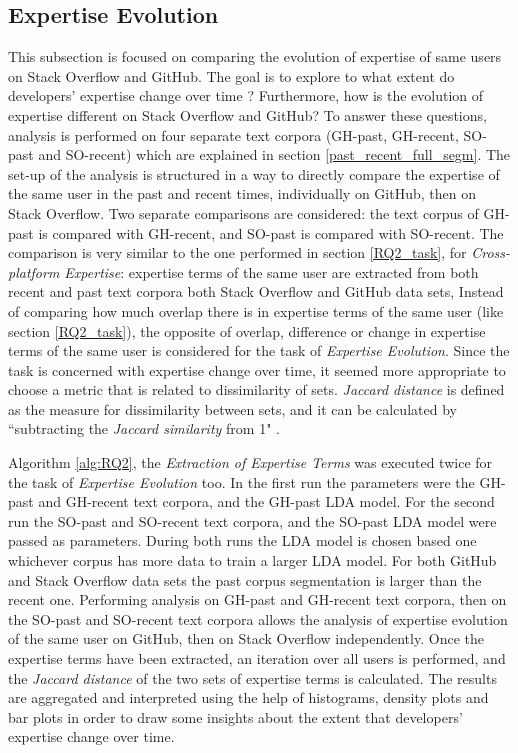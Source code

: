     \subsection{Expertise Evolution\label{RQ4_task}}
        
        This subsection is focused on comparing the evolution of expertise of same users on Stack Overflow and GitHub. The goal is to explore to what extent do developers' expertise change over time ? Furthermore, how is the evolution of expertise different on Stack Overflow and GitHub? To answer these questions, analysis is performed on four separate text corpora (GH-past, GH-recent, SO-past and SO-recent) which are explained in section \ref{past_recent_full_segm}. The set-up of the analysis is structured in a way to directly compare the expertise of the same user in the past and recent times, individually on GitHub, then on Stack Overflow. Two separate comparisons are considered: the text corpus of GH-past is compared with GH-recent, and SO-past is compared with SO-recent. The comparison is very similar to the one performed in section \ref{RQ2_task}, for \emph{Cross-platform Expertise}: expertise terms of the same user are extracted from both recent and past text corpora both Stack Overflow and GitHub data sets, Instead of comparing how much overlap there is in expertise terms of the same user (like section \ref{RQ2_task}), the opposite of overlap, difference or change in expertise terms of the same user is considered for the task of \emph{Expertise Evolution}. Since the task is concerned with expertise change over time, it seemed more appropriate to choose a metric that is related to dissimilarity of sets. \emph{Jaccard distance} is defined as the measure for dissimilarity between sets, and it can be calculated by ``subtracting the \emph{Jaccard similarity} from 1" \cite{jaccard_wiki}.
        
        Algorithm \ref{alg:RQ2}, the \emph{Extraction of Expertise Terms} was executed twice for the task of \emph{Expertise Evolution} too. In the first run the parameters were the GH-past and GH-recent text corpora, and the GH-past LDA model. For the second run the SO-past and SO-recent text corpora, and the SO-past LDA model were passed as parameters. During both runs the LDA model is chosen based one whichever corpus has more data to train a larger LDA model. For both GitHub and Stack Overflow data sets the past corpus segmentation is larger than the recent one. Performing analysis on GH-past and GH-recent text corpora, then on the SO-past and SO-recent text corpora allows the analysis of expertise evolution of the same user on GitHub, then on Stack Overflow independently. Once the expertise terms have been extracted, an iteration over all users is performed, and the \emph{Jaccard distance} of the two sets of expertise terms is calculated. The results are aggregated and interpreted using the help of histograms, density plots and bar plots in order to draw some insights about the extent that developers' expertise change over time.

